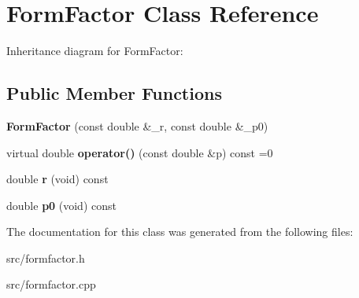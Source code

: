 \hypertarget{class_form_factor}{}\section{Form\+Factor Class Reference}
\label{class_form_factor}


Inheritance diagram for Form\+Factor\+:
\subsection*{Public Member Functions}
\begin{DoxyCompactItemize}
\item 
\hypertarget{class_form_factor_a4f459107b6f07b4feed2ca3e864fbaae}{}{\bfseries Form\+Factor} (const double \&\+\_\+r, const double \&\+\_\+p0)\label{class_form_factor_a4f459107b6f07b4feed2ca3e864fbaae}

\item 
\hypertarget{class_form_factor_a6ba8bbcd45c781b194a0df415975ca21}{}virtual double {\bfseries operator()} (const double \&p) const =0\label{class_form_factor_a6ba8bbcd45c781b194a0df415975ca21}

\item 
\hypertarget{class_form_factor_a17af69004399ab28a93af6a6558d0278}{}double {\bfseries r} (void) const \label{class_form_factor_a17af69004399ab28a93af6a6558d0278}

\item 
\hypertarget{class_form_factor_aa0c4f97c7245f646e8167590b9ba5f2d}{}double {\bfseries p0} (void) const \label{class_form_factor_aa0c4f97c7245f646e8167590b9ba5f2d}

\end{DoxyCompactItemize}


The documentation for this class was generated from the following files\+:\begin{DoxyCompactItemize}
\item 
src/formfactor.\+h\item 
src/formfactor.\+cpp\end{DoxyCompactItemize}
